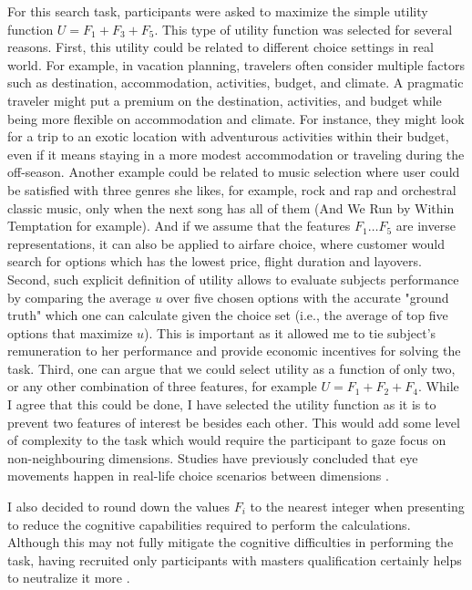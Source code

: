 \documentclass[a4paper,12pt]{article}
\begin{document}
For this search task, participants were asked to maximize the simple utility function  $U = F_1 + F_3 + F_5$. This type of utility function was selected for several reasons. First, this utility could be related to different choice settings in real world. For example, in vacation planning, travelers often consider multiple factors such as destination, accommodation, activities, budget, and climate. A pragmatic traveler might put a premium on the destination, activities, and budget while being more flexible on accommodation and climate. For instance, they might look for a trip to an exotic location with adventurous activities within their budget, even if it means staying in a more modest accommodation or traveling during the off-season. Another example could be related to music selection where user could be satisfied with three genres she likes, for example, rock and rap and orchestral classic music, only when the next song has all of them (And We Run by Within Temptation for example). And if we assume that the features $F_1 \dots F_5$ are inverse representations, it can also be applied to airfare choice, where customer would search for options which has the lowest price, flight duration and layovers.  Second, such explicit definition of utility allows to evaluate subjects performance by comparing the average $u$ over five chosen options with the accurate "ground truth" which one can calculate given the choice set (i.e., the average of top five options that maximize $u$). This is important as it allowed me to tie subject's remuneration to her performance and provide economic incentives for solving the task. Third, one can argue that we could select utility as a function of only two, or any other combination of three features, for example $U = F_1 + F_2 + F_4$. While I agree that this could be done, I have selected the utility function as it is to prevent two features of interest be besides each other. This would add some level of complexity to the task which would require the participant to gaze focus on non-neighbouring dimensions. Studies have previously concluded that eye movements happen in real-life choice scenarios between dimensions \citep{noguchi2018multialternative}.

I also decided to round down the values $F_i$ to the nearest integer when presenting to reduce the cognitive capabilities required to perform the calculations. Although this may not fully mitigate the cognitive difficulties in performing the task, having recruited only participants with masters qualification certainly helps to neutralize it more \citep{aguinis2020mturk}.
\end{document}
